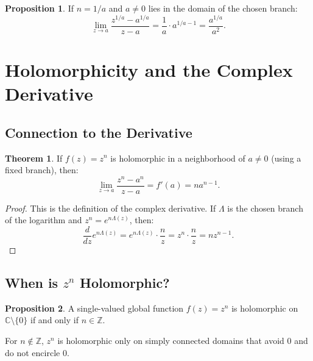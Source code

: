 \documentclass{article}
\theoremstyle{definition}
\newtheorem{theorem}{Theorem}[section]
\newtheorem{proposition}{Proposition}[section]
\theoremstyle{remark}
\newcommand{\C}{\mathbb{C}}
\newcommand{\Z}{\mathbb{Z}}
\begin{document}
\begin{proposition}
If $n = 1/a$ and $a \neq 0$ lies in the domain of the chosen branch:
\begin{equation}
\lim_{z \to a} \frac{z^{1/a} - a^{1/a}}{z - a} = \frac{1}{a} \cdot a^{1/a - 1} = \frac{a^{1/a}}{a^2}.
\end{equation}
\end{proposition}

\section{Holomorphicity and the Complex Derivative}

\subsection{Connection to the Derivative}

\begin{theorem}
If $f(z) = z^n$ is holomorphic in a neighborhood of $a \neq 0$ (using a fixed branch), then:
\begin{equation}
\lim_{z \to a} \frac{z^n - a^n}{z - a} = f'(a) = n a^{n-1}.
\end{equation}
\end{theorem}

\begin{proof}
This is the definition of the complex derivative. If $\Lambda$ is the chosen
branch of the logarithm and $z^n = e^{n\Lambda(z)}$, then:
\begin{equation}
\frac{d}{dz} e^{n\Lambda(z)} = e^{n\Lambda(z)} \cdot \frac{n}{z} = z^n \cdot \frac{n}{z} = n z^{n-1}.
\end{equation}
\end{proof}

\subsection{When is $z^n$ Holomorphic?}

\begin{proposition}
A single-valued global function $f(z) = z^n$ is holomorphic on $\C \setminus \{0\}$ if and only if $n \in \Z$.

For $n \notin \Z$, $z^n$ is holomorphic only on simply connected domains that avoid $0$ and do not encircle $0$.
\end{proposition}
\end{document}
